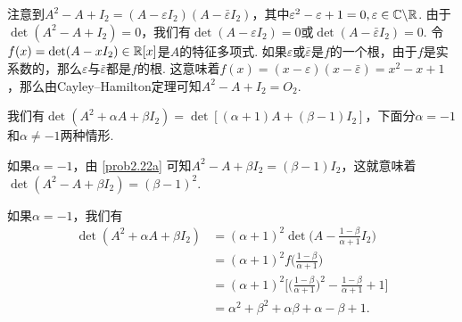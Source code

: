 \begin{solution}
  \begin{inparaenum}[(a)]
    \item 注意到$A^2-A+I_2=(A-\varepsilon I_2)(A-\bar\varepsilon I_2)$，其中$\varepsilon^2-\varepsilon+1=0,
        \varepsilon\in\mathbb C\backslash\mathbb R$. 由于$\det(A^2-A+I_2)=0$，我们有$\det(A-\varepsilon I_2)=0$或$\det(A-\bar\varepsilon I_2)=0$. 令$f(x)=\det(A-xI_2)\in\mathbb R[x]$是$A$的特征多项式. 如果$\varepsilon$或$\bar\varepsilon$是$f$的一个根，由于$f$是实系数的，那么$\varepsilon$与$\bar\varepsilon$都是$f$的根. 这意味着$f(x)=(x-\varepsilon)(x-\bar\varepsilon)=x^2-x+1$，那么由Cayley--Hamilton定理可知$A^2-A+I_2=O_2$.

    \item 我们有$\det(A^2+\alpha A+\beta I_2)=\det[(\alpha+1)A+(\beta-1)I_2]$，下面分$\alpha=-1$和$\alpha\ne-1$两种情形.

        如果$\alpha=-1$，由 \ref{prob2.22a} 可知$A^2-A+\beta I_2=(\beta-1)I_2$，这就意味着$\det(A^2-A+\beta I_2)=(\beta-1)^2$.

        如果$\alpha=-1$，我们有
        \begin{align*}
          \det(A^2 + \alpha A + \beta I_2) & = (\alpha + 1)^2 \det \Big( A - \frac{1-\beta}{\alpha+1} I_2\Big) \\
          & = (\alpha + 1)^2 f\Big( \frac{1-\beta}{\alpha+1} \Big) \\
          & = (\alpha + 1)^2 \bigg[
            \Big( \frac{1-\beta}{\alpha+1} \Big)^2 - \frac{1-\beta}{\alpha+1} + 1
          \bigg] \\
          & = \alpha^2 + \beta^2 + \alpha\beta + \alpha - \beta + 1.
        \end{align*}
  \end{inparaenum}
\end{solution}


